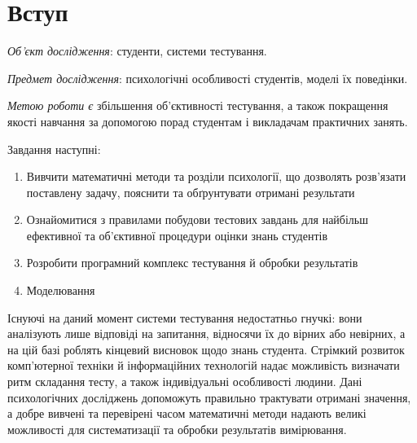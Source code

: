 \chapter*{Вступ}

\textit{Об’єкт дослідження}:
студенти, системи тестування.

\textit{Предмет дослідження}:
психологічні особливості студентів, моделі їх поведінки.

\textit{Метою роботи є}
збільшення об’єктивності тестування, а також покращення
якості навчання за допомогою порад студентам і викладачам практичних занять.

Завдання наступні:
\begin{enumerate}
  \item
    Вивчити математичні методи та розділи психології, що дозволять розв’язати
    поставлену задачу, пояснити та обґрунтувати отримані результати
  \item
    Ознайомитися з правилами побудови тестових завдань для найбільш
    ефективної та об’єктивної процедури оцінки знань студентів
  \item
    Розробити програмний комплекс тестування й обробки результатів
  \item
    Моделювання
\end{enumerate}

Існуючі на даний момент системи тестування недостатньо гнучкі: вони
аналізують лише відповіді на запитання, відносячи їх до вірних або невірних,
а на цій базі роблять кінцевий висновок щодо знань студента.
Стрімкий розвиток комп’ютерної техніки й інформаційних технологій надає
можливість визначати ритм складання тесту, а також індивідуальні особливості
людини.
Дані психологічних досліджень допоможуть правильно трактувати отримані
значення, а добре вивчені та перевірені часом математичні методи надають
великі можливості для систематизації та обробки результатів вимірювання.
